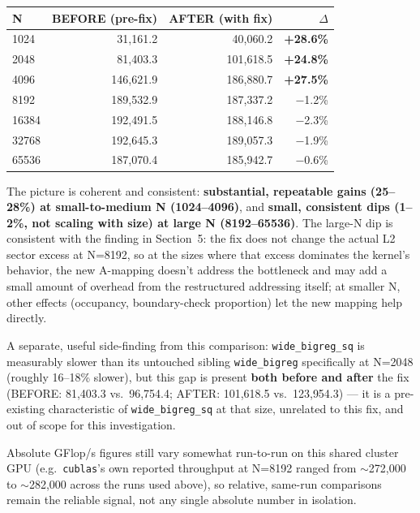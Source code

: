 \documentclass[11pt]{article}
\begin{document}
\begin{table}[h]
\centering
\begin{tabular}{lrrr}
\toprule
N & BEFORE (pre-fix) & AFTER (with fix) & $\Delta$ \\
\midrule
1024  & 31{,}161.2  & 40{,}060.2  & \textbf{+28.6\%} \\
2048  & 81{,}403.3  & 101{,}618.5 & \textbf{+24.8\%} \\
4096  & 146{,}621.9 & 186{,}880.7 & \textbf{+27.5\%} \\
8192  & 189{,}532.9 & 187{,}337.2 & $-$1.2\% \\
16384 & 192{,}491.5 & 188{,}146.8 & $-$2.3\% \\
32768 & 192{,}645.3 & 189{,}057.3 & $-$1.9\% \\
65536 & 187{,}070.4 & 185{,}942.7 & $-$0.6\% \\
\bottomrule
\end{tabular}
\end{table}

The picture is coherent and consistent: \textbf{substantial, repeatable gains (25--28\%) at small-to-medium N (1024--4096)}, and \textbf{small, consistent dips (1--2\%, not scaling with size) at large N (8192--65536)}. The large-N dip is consistent with the finding in Section~5: the fix does not change the actual L2 sector excess at N=8192, so at the sizes where that excess dominates the kernel's behavior, the new A-mapping doesn't address the bottleneck and may add a small amount of overhead from the restructured addressing itself; at smaller N, other effects (occupancy, boundary-check proportion) let the new mapping help directly.

A separate, useful side-finding from this comparison: \texttt{wide\_bigreg\_sq} is measurably slower than its untouched sibling \texttt{wide\_bigreg} specifically at N=2048 (roughly 16--18\% slower), but this gap is present \textbf{both before and after} the fix (BEFORE: 81{,}403.3 vs.\ 96{,}754.4; AFTER: 101{,}618.5 vs.\ 123{,}954.3) --- it is a pre-existing characteristic of \texttt{wide\_bigreg\_sq} at that size, unrelated to this fix, and out of scope for this investigation.

Absolute GFlop/s figures still vary somewhat run-to-run on this shared cluster GPU (e.g.\ \texttt{cublas}'s own reported throughput at N=8192 ranged from $\sim$272{,}000 to $\sim$282{,}000 across the runs used above), so relative, same-run comparisons remain the reliable signal, not any single absolute number in isolation.
\end{document}
